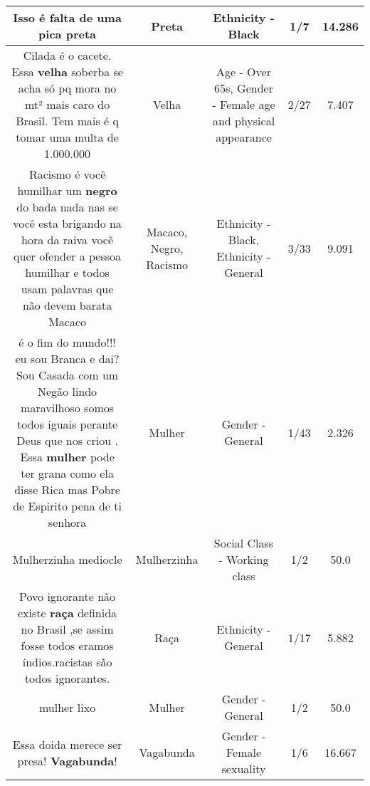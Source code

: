 \documentclass[11pt]{article}
\newlength\mylength
\begin{document}
\begin{center}
\begin{longtable}{|C{.65\mylength}|C{.30\mylength}|C{.12\mylength}|C{.12\mylength}|C{.12\mylength}|}
  \small Isso é falta de uma pica preta\normalsize   & Preta & Ethnicity - Black & 1/7 & 14.286 \\  \hline
  \small Cilada é o cacete. Essa \textbf{v\textbf{elha}} soberba se acha só pq mora no mt² mais caro do Brasil. Tem mais é q tomar uma multa de 1.000.000\normalsize   & Velha & Age - Over 65s, Gender - Female age and physical appearance & 2/27 & 7.407 \\  \hline
  \small Racismo é você humilhar um \textbf{negro} do bada nada nas se você esta brigando na hora da raiva você quer ofender a pessoa humilhar e todos usam palavras que não devem barata  Macaco\normalsize   & Macaco, Negro, Racismo & Ethnicity - Black, Ethnicity - General & 3/33 & 9.091 \\  \hline
  \small é o fim do mundo!!! eu sou Branca e dai? Sou Casada com um Negão lindo maravilhoso somos todos iguais perante Deus que nos criou . Essa \textbf{mulher} pode ter grana como ela disse Rica mas Pobre de Espirito pena de ti senhora\normalsize   & Mulher & Gender - General & 1/43 & 2.326 \\  \hline
  \small Mulherzinha  mediocle\normalsize   & Mulherzinha & Social Class - Working class & 1/2 & 50.0 \\  \hline
  \small Povo ignorante não existe \textbf{raça} definida no Brasil ,se assim fosse todos eramos índios.racistas são todos ignorantes.\normalsize   & Raça & Ethnicity - General & 1/17 & 5.882 \\  \hline
  \small mulher lixo\normalsize   & Mulher & Gender - General & 1/2 & 50.0 \\  \hline
  \small Essa doida merece ser presa! \textbf{Vagabunda}!\normalsize   & Vagabunda & Gender - Female sexuality & 1/6 & 16.667 \\  \hline

\end{longtable}
\end{center}
\end{document}
